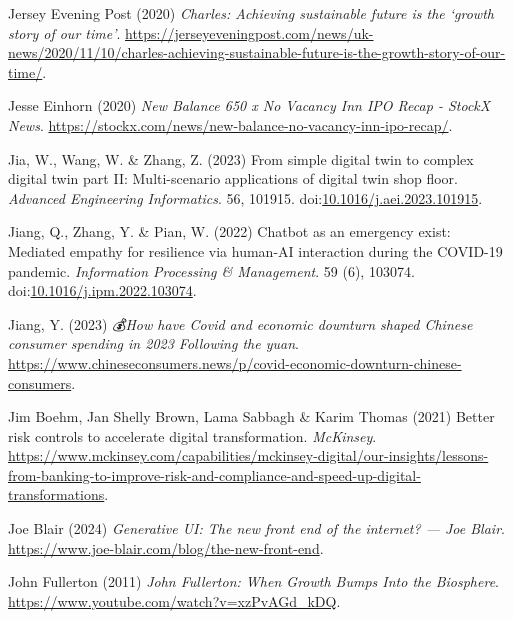 \documentclass[
  letterpaper,
  DIV=11,
  numbers=noendperiod]{scrartcl}
\newlength{\cslhangindent}
\newenvironment{CSLReferences}[2] %
 {\begin{list}{}{%
  \setlength{\itemindent}{0pt}
  \setlength{\leftmargin}{0pt}
  \setlength{\parsep}{0pt}
  \ifodd #1
   \setlength{\leftmargin}{\cslhangindent}
   \setlength{\itemindent}{-1\cslhangindent}
  \fi
  \setlength{\itemsep}{#2\baselineskip}}}
 {\end{list}}
\begin{document}
\begin{CSLReferences}{0}{1}
Jersey Evening Post (2020) \emph{Charles: {Achieving} sustainable future
is the {`growth story of our time'}}.
\url{https://jerseyeveningpost.com/news/uk-news/2020/11/10/charles-achieving-sustainable-future-is-the-growth-story-of-our-time/}.

Jesse Einhorn (2020) \emph{New {Balance} 650 x {No Vacancy Inn IPO
Recap} - {StockX News}}.
\url{https://stockx.com/news/new-balance-no-vacancy-inn-ipo-recap/}.

Jia, W., Wang, W. \& Zhang, Z. (2023) From simple digital twin to
complex digital twin part {II}: {Multi-scenario} applications of digital
twin shop floor. \emph{Advanced Engineering Informatics}. 56, 101915.
doi:\href{https://doi.org/10.1016/j.aei.2023.101915}{10.1016/j.aei.2023.101915}.

Jiang, Q., Zhang, Y. \& Pian, W. (2022) Chatbot as an emergency exist:
{Mediated} empathy for resilience via human-{AI} interaction during the
{COVID-19} pandemic. \emph{Information Processing \& Management}. 59
(6), 103074.
doi:\href{https://doi.org/10.1016/j.ipm.2022.103074}{10.1016/j.ipm.2022.103074}.

Jiang, Y. (2023) \emph{💰{How} have {Covid} and economic downturn shaped
{Chinese} consumer spending in 2023 {\textbar} {Following} the yuan}.
\url{https://www.chineseconsumers.news/p/covid-economic-downturn-chinese-consumers}.

Jim Boehm, Jan Shelly Brown, Lama Sabbagh \& Karim Thomas (2021) Better
risk controls to accelerate digital transformation. \emph{McKinsey}.
\url{https://www.mckinsey.com/capabilities/mckinsey-digital/our-insights/lessons-from-banking-to-improve-risk-and-compliance-and-speed-up-digital-transformations}.

Joe Blair (2024) \emph{Generative {UI}: The new front end of the
internet? --- {Joe Blair}}.
\url{https://www.joe-blair.com/blog/the-new-front-end}.

John Fullerton (2011) \emph{John {Fullerton}: {When Growth Bumps Into}
the {Biosphere}}. \url{https://www.youtube.com/watch?v=xzPvAGd_kDQ}.


\end{CSLReferences}
\end{document}
